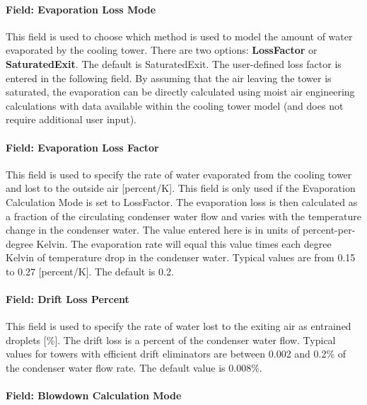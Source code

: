 \paragraph{Field: Evaporation Loss Mode}\label{field-evaporation-loss-mode-1}

This field is used to choose which method is used to model the amount of water evaporated by the cooling tower. There are two options: \textbf{LossFactor} or \textbf{SaturatedExit}. The default is SaturatedExit. The user-defined loss factor is entered in the following field. By assuming that the air leaving the tower is saturated, the evaporation can be directly calculated using moist air engineering calculations with data available within the cooling tower model (and does not require additional user input).

\paragraph{Field: Evaporation Loss Factor}\label{field-evaporation-loss-factor-1}

This field is used to specify the rate of water evaporated from the cooling tower and lost to the outside air {[}percent/K{]}. This field is only used if the Evaporation Calculation Mode is set to LossFactor. The evaporation loss is then calculated as a fraction of the circulating condenser water flow and varies with the temperature change in the condenser water. The value entered here is in units of percent-per-degree Kelvin. The evaporation rate will equal this value times each degree Kelvin of temperature drop in the condenser water. Typical values are from 0.15 to 0.27 {[}percent/K{]}. The default is 0.2.

\paragraph{Field: Drift Loss Percent}\label{field-drift-loss-percent-1}

This field is used to specify the rate of water lost to the exiting air as entrained droplets {[}\%{]}. The drift loss is a percent of the condenser water flow. Typical values for towers with efficient drift eliminators are between 0.002 and 0.2\% of the condenser water flow rate. The default value is 0.008\%.

\paragraph{Field: Blowdown Calculation Mode}\label{field-blowdown-calculation-mode-1}

